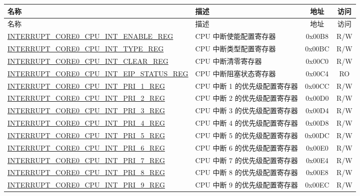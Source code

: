 
\begin{longtable}{ | p{8.0cm} | p{6.4cm} | c | c| }
\hline\rowcolor{lightgray}
名称 & 描述 & 地址 & 访问 \\ \hline
\endfirsthead
\hline
\rowcolor{lightgray}
名称 & 描述 & 地址 & 访问 \\ \hline
\hline
\endhead
\endfoot

\hyperref[regdesc:INTERRUPTCORE0CPUINTENABLEREG]{INTERRUPT\_CORE0\_CPU\_INT\_ENABLE\_REG} & CPU 中断使能配置寄存器 & 0x00B8 & R/W \\ \hline
\hyperref[regdesc:INTERRUPTCORE0CPUINTTYPEREG]{INTERRUPT\_CORE0\_CPU\_INT\_TYPE\_REG} & CPU 中断类型配置寄存器 & 0x00BC & R/W \\ \hline
\hyperref[regdesc:INTERRUPTCORE0CPUINTCLEARREG]{INTERRUPT\_CORE0\_CPU\_INT\_CLEAR\_REG} & CPU 中断清零寄存器 & 0x00C0 & R/W \\ \hline
\hyperref[regdesc:INTERRUPTCORE0CPUINTEIPSTATUSREG]{INTERRUPT\_CORE0\_CPU\_INT\_EIP\_STATUS\_REG} & CPU 中断阻塞状态寄存器 & 0x00C4 & RO \\ \hline
\hyperref[regdesc:INTERRUPTCORE0CPUINTPRI0REG]{INTERRUPT\_CORE0\_CPU\_INT\_PRI\_1\_REG} & CPU 中断 1 的优先级配置寄存器 & 0x00CC & R/W \\ \hline
\hyperref[regdesc:INTERRUPTCORE0CPUINTPRI0REG]{INTERRUPT\_CORE0\_CPU\_INT\_PRI\_2\_REG} & CPU 中断 2 的优先级配置寄存器 & 0x00D0 & R/W \\ \hline
\hyperref[regdesc:INTERRUPTCORE0CPUINTPRI0REG]{INTERRUPT\_CORE0\_CPU\_INT\_PRI\_3\_REG} & CPU 中断 3 的优先级配置寄存器 & 0x00D4 & R/W \\ \hline
\hyperref[regdesc:INTERRUPTCORE0CPUINTPRI0REG]{INTERRUPT\_CORE0\_CPU\_INT\_PRI\_4\_REG} & CPU 中断 4 的优先级配置寄存器 & 0x00D8 & R/W \\ \hline
\hyperref[regdesc:INTERRUPTCORE0CPUINTPRI0REG]{INTERRUPT\_CORE0\_CPU\_INT\_PRI\_5\_REG} & CPU 中断 5 的优先级配置寄存器 & 0x00DC & R/W \\ \hline
\hyperref[regdesc:INTERRUPTCORE0CPUINTPRI0REG]{INTERRUPT\_CORE0\_CPU\_INT\_PRI\_6\_REG} & CPU 中断 6 的优先级配置寄存器 & 0x00E0 & R/W \\ \hline
\hyperref[regdesc:INTERRUPTCORE0CPUINTPRI0REG]{INTERRUPT\_CORE0\_CPU\_INT\_PRI\_7\_REG} & CPU 中断 7 的优先级配置寄存器  & 0x00E4 & R/W \\ \hline
\hyperref[regdesc:INTERRUPTCORE0CPUINTPRI0REG]{INTERRUPT\_CORE0\_CPU\_INT\_PRI\_8\_REG} & CPU 中断 8 的优先级配置寄存器 & 0x00E8 & R/W \\ \hline
\hyperref[regdesc:INTERRUPTCORE0CPUINTPRI0REG]{INTERRUPT\_CORE0\_CPU\_INT\_PRI\_9\_REG} & CPU 中断 9 的优先级配置寄存器 & 0x00EC & R/W \\ \hline

\end{longtable}

